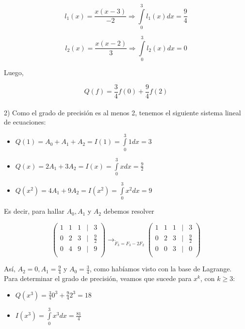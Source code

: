 $$l_{1}(x) = \frac{x(x - 3)}{-2} \Rightarrow \int \limits_{0}^{3} l_{1}(x) dx = \frac{9}{4}$$

$$l_{2}(x) = \frac{x(x - 2)}{3} \Rightarrow \int \limits_{0}^{3} l_{2}(x) dx = 0$$

Luego,

$$Q(f) = \frac{3}{4}f(0) + \frac{9}{4}f(2)$$\\

2) Como el grado de precisi\'on es al menos 2, tenemos el siguiente sistema lineal de ecuaciones:

\begin{itemize}
	\item $Q(1) = A_{0} + A_{1} + A_{2} = I(1) = \int \limits_{0}^{3} 1 dx = 3$
	\item $Q(x) = 2A_{1} + 3A_{2} = I(x) = \int \limits_{0}^{3} x dx = \frac{9}{2}$
	\item $Q(x^{2}) = 4A_{1} + 9A_{2} = I(x^{2}) = \int \limits_{0}^{3} x^{2} dx = 9$
\end{itemize}

Es decir, para hallar $A_{0}, A_{1}$ y $A_{2}$ debemos resolver

$$
    \begin{pmatrix}
        1 & 1 & 1 & | & 3\\
        0 & 2 & 3 & | & \frac{9}{2}\\
        0 & 4 & 9 & | & 9\\
	\end{pmatrix}
	\rightarrow_{\tilde{F}_{3} = F_{3} - 2F_{2}}
    \begin{pmatrix}
        1 & 1 & 1 & | & 3\\
        0 & 2 & 3 & | & \frac{9}{2}\\
        0 & 0 & 3 & | & 0\\
	\end{pmatrix}
$$

As\'i, $A_{2} = 0, A_{1} = \frac{9}{4}$ y $A_{0} = \frac{3}{4}$, como hab\'iamos visto con la base de Lagrange.\\

Para determinar el grado de precisi\'on, veamos que sucede para $x^{k}$, con $k \geq 3$:

\begin{itemize}
	\item $Q(x^{3}) = \frac{3}{4}0^{3} + \frac{9}{4}2^{3} = 18$
	\item $I(x^{3}) = \int \limits_{0}^{3} x^{3} dx = \frac{81}{4}$
\end{itemize}

